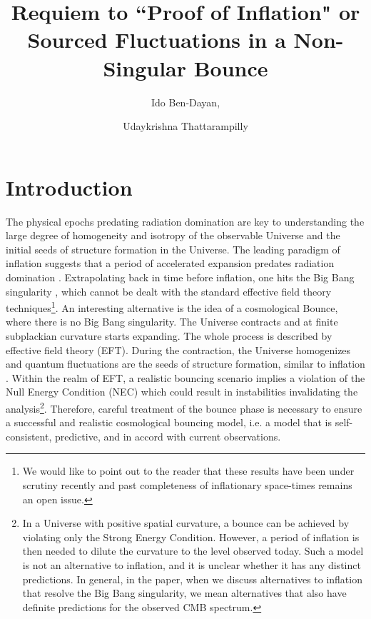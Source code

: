 \documentclass[12pt,a4paper]{article}
\title{Requiem to ``Proof of Inflation" or Sourced Fluctuations in a Non-Singular Bounce}
\author[a]{Ido Ben-Dayan,}
\author[a]{Udaykrishna Thattarampilly}
\affiliation{Physics Department, Ariel University, Ariel 40700, Israel}
\numberwithin{equation}{section}
\numberwithin{equation}{section}
\begin{document}
\maketitle
\section{Introduction}
The physical epochs predating radiation domination are key to understanding the large degree of homogeneity and isotropy of the observable Universe and the initial seeds of structure formation in the Universe. The leading paradigm of inflation suggests that a period of accelerated expansion predates radiation domination \cite{Martin:2013tda}. Extrapolating back in time before inflation, one hits the Big Bang singularity \cite{Borde:1996pt,Borde:2001nh}, which cannot be dealt with the standard effective field theory techniques\footnote{We would like to point out to the reader that these results have been under scrutiny recently \cite{Lesnefsky:2022fen} and past completeness of inflationary space-times remains an open issue.}. 
An interesting alternative is the idea of a cosmological Bounce, where there is no Big Bang singularity. The Universe contracts and at finite subplackian curvature starts expanding. The whole process is described by effective field theory (EFT). During the contraction, the Universe homogenizes and quantum fluctuations are the seeds of structure formation, similar to inflation \cite{Brandenberger:2012zb,BATTEFELD20151}.
Within the realm of EFT, a realistic bouncing scenario implies a violation of the Null Energy Condition (NEC) which could result in instabilities invalidating the analysis\footnote{In a Universe with positive spatial curvature, a bounce can be achieved by violating only the Strong Energy Condition. However, a period of inflation is then needed to dilute the curvature to the level observed today. Such a model is not an alternative to inflation, and it is unclear whether it has any distinct predictions. In general, in the paper, when we discuss alternatives to inflation that resolve the Big Bang singularity, we mean alternatives that also have definite predictions for the observed CMB spectrum.}. Therefore, careful treatment of the bounce phase is necessary to ensure a successful and realistic cosmological bouncing model, i.e. a model that is self-consistent, predictive, and in accord with current observations.
\end{document}
